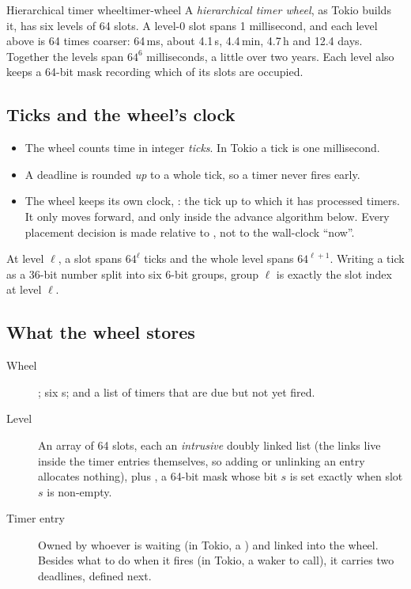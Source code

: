 \begin{definition}{Hierarchical timer wheel}{timer-wheel}
    A \emph{hierarchical timer wheel}, as Tokio builds it, has six levels of 64 slots. A level-0 slot spans 1 millisecond, and each level above is 64 times coarser: 64\,ms, about 4.1\,s, 4.4\,min, 4.7\,h and 12.4 days. Together the levels span $64^6$ milliseconds, a little over two years. Each level also keeps a 64-bit mask recording which of its slots are occupied.
\end{definition}

\subsection{Ticks and the wheel's clock}

\begin{itemize}
    \item The wheel counts time in integer \emph{ticks}. In Tokio a tick is one millisecond.
    \item A deadline is rounded \emph{up} to a whole tick, so a timer never fires early.
    \item The wheel keeps its own clock, : the tick up to which it has processed timers. It only moves forward, and only inside the advance algorithm below. Every placement decision is made relative to , not to the wall-clock ``now''.
\end{itemize}

At level $\ell$, a slot spans $64^{\ell}$ ticks and the whole level spans $64^{\ell+1}$. Writing a tick as a 36-bit number split into six 6-bit groups, group $\ell$ is exactly the slot index at level $\ell$.

\subsection{What the wheel stores}

\begin{description}
    \item[Wheel] ; six s; and a  list of timers that are due but not yet fired.
    \item[Level] An array of 64 slots, each an \emph{intrusive} doubly linked list (the links live inside the timer entries themselves, so adding or unlinking an entry allocates nothing), plus , a 64-bit mask whose bit $s$ is set exactly when slot $s$ is non-empty.
    \item[Timer entry] Owned by whoever is waiting (in Tokio, a ) and linked into the wheel. Besides what to do when it fires (in Tokio, a waker to call), it carries two deadlines, defined next.
\end{description}


